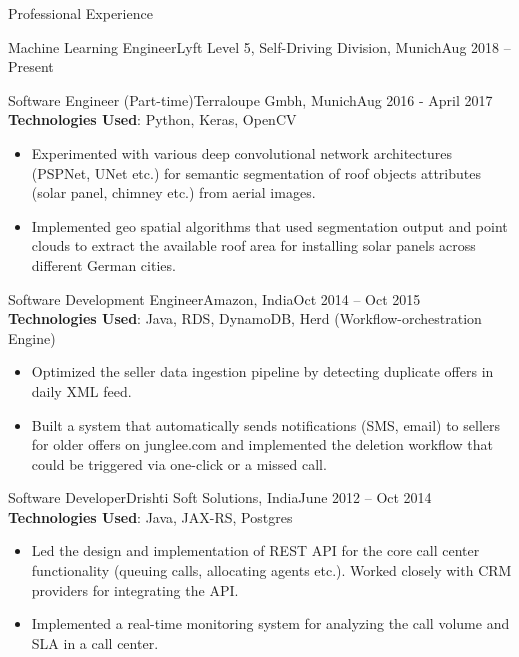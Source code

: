 \documentclass[]{mcdowellcv}
\begin{document}
\begin{cvsection}{Professional Experience}
\begin{cvsubsection}{Machine Learning Engineer}{Lyft Level 5, Self-Driving Division, Munich}{Aug 2018 -- Present}
		\end{cvsubsection}
		
		
		\begin{cvsubsection}{Software Engineer (Part-time)}{Terraloupe Gmbh, Munich}{Aug 2016 - April 2017}
			\textbf{Technologies Used}: Python, Keras, OpenCV
			\begin{itemize}
				\item Experimented with various deep convolutional network architectures (PSPNet, UNet etc.) for semantic segmentation of roof objects attributes (solar panel, chimney etc.) from aerial images.
				\item Implemented geo spatial algorithms that used segmentation output and point clouds to extract the available roof area for installing solar panels across different German cities.
			\end{itemize}
		\end{cvsubsection}
		
		
		\begin{cvsubsection}{Software Development Engineer}{Amazon, India}{Oct 2014 -- Oct 2015}  
			\textbf{Technologies Used}: Java, RDS, DynamoDB, Herd (Workflow-orchestration Engine)
			\begin{itemize}
				\item Optimized the seller data ingestion pipeline by detecting duplicate offers in daily XML feed.
				\item Built a system that automatically sends notifications (SMS, email) to sellers for older offers on junglee.com and implemented the deletion
				workflow that could be triggered via one-click or a missed call.
			\end{itemize}
		\end{cvsubsection}
		
		\begin{cvsubsection}{Software Developer}{Drishti Soft Solutions, India}{June 2012 -- Oct 2014}
			\textbf{Technologies Used}: Java, JAX-RS, Postgres
			\begin{itemize} 
				\item Led the design and implementation of REST API for the core call center functionality (queuing calls, allocating agents etc.). Worked closely with CRM providers for integrating the API.  
				\item Implemented a real-time monitoring system for analyzing the call volume and SLA in a call center. 
			\end{itemize}
		\end{cvsubsection}
	\end{cvsection}
	

	
\end{document}
